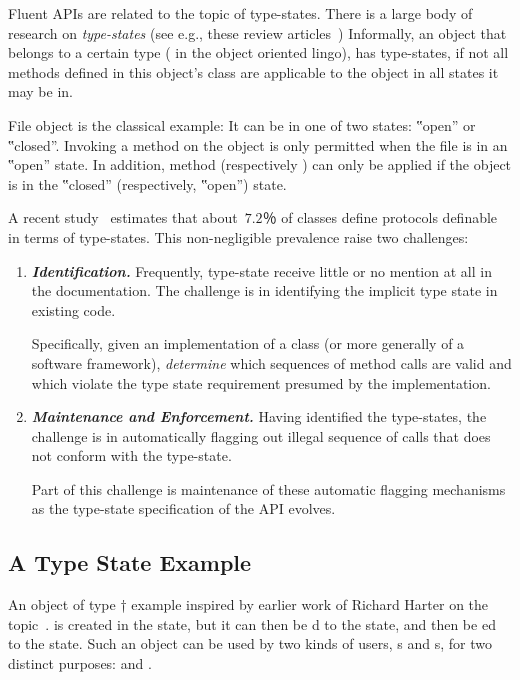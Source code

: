 Fluent APIs are related to the topic of type-states.
There is a large body of research on \emph{type-states} (see
e.g., these review articles~\cite{Aldrich:Sunshine:2009,Bierhoff:Aldrich:2005})
Informally, an object that belongs to a certain type ( in the object
oriented lingo), has type-states, if not all methods defined in this object's
class are applicable to the object in all states it may be in.

File object is the classical example: It can be in one of two states: ‟open” or
‟closed”. Invoking a  method on the object is only permitted when
the file is in an ‟open” state. In addition, method  (respectively
) can only be applied if the object is in the ‟closed”
(respectively, ‟open”) state.

A recent study~\cite{Beckman:11} estimates that about~$7.2％$ of \Java
classes define protocols definable in terms of type-states.
This non-negligible prevalence raise two challenges:
\begin{enumerate}
  \item \emph{\textbf{Identification.}} Frequently, type-state receive little
    or no mention at all in the documentation. The challenge is in identifying
    the implicit type state in existing code.
        \par
    Specifically, given an implementation of a class (or more generally of a
    software framework), \emph{determine} which sequences of method calls are
    valid and which violate the type state requirement presumed by the
    implementation. \item \emph{\textbf{Maintenance and Enforcement.}} Having
    identified the type-states, the challenge is in automatically flagging out
    illegal sequence of calls that does not conform with the type-state.
        \par
    Part of this challenge is maintenance of these automatic flagging
    mechanisms as the type-state specification of the API evolves.
\end{enumerate}

\subsection{A Type State Example}

An object of type †
{%
  example inspired by earlier work of Richard Harter on the
  topic~\cite{Harter:05}.
}
is created in the  state, but it can then be d to the
 state, and then be ed to the  state.
Such an object can be used by two kinds of users, s and s,
for two distinct purposes:  and .


